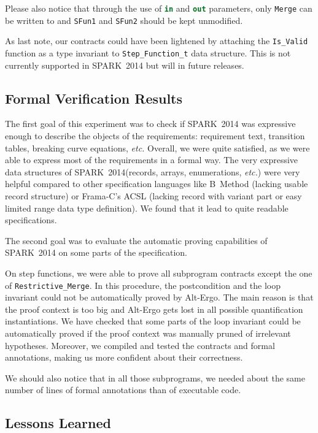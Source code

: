 \documentclass[10pt,a4paper,twocolumn]{article}
\newcommand{\newspark}{SPARK~2014\xspace}
\newcommand{\altergo}{Alt-Ergo\xspace}
\newcommand{\etc}{\textit{etc.}\xspace}
\newcommand{\SPARK}[1]{\lstinline[language=Ada,basicstyle={\footnotesize
      \sffamily},framesep=0pt]$#1$}
\begin{document}
Please also notice that through the use of \SPARK{in} and \SPARK{out}
parameters, only \SPARK{Merge} can be written to and \SPARK{SFun1} and
\SPARK{SFun2} should be kept unmodified.

As last note, our contracts could have been lightened by attaching the
\SPARK{Is_Valid} function as a type invariant to
\SPARK{Step_Function_t} data structure. This is not currently
supported in \newspark but will in future releases.

\subsection{Formal Verification Results}

The first goal of this experiment was to check if \newspark was
expressive enough to describe the objects of the requirements:
requirement text, transition tables, breaking curve equations, \etc
Overall, we were quite satisfied, as we were able to express most of
the requirements in a formal way. The very expressive data structures
of \newspark (records, arrays, enumerations, \etc) were very helpful
compared to other specification languages like B~Method\cite{b-book}
(lacking usable record structure) or Frama-C's ACSL\cite{acsl}
(lacking record with variant part or easy limited range data type
definition). We found that it lead to quite readable specifications.

The second goal was to evaluate the automatic proving capabilities of \newspark
on some parts of the specification.

On step functions, we were able to prove all subprogram
contracts except the one of \SPARK{Restrictive_Merge}. In this procedure, the
postcondition and the loop invariant could not be automatically
proved by \altergo. The main reason is that the proof context is too
big and \altergo gets lost in all possible quantification
instantiations. We have checked that some parts of the loop invariant
could be automatically proved if the proof context was manually pruned
of irrelevant hypotheses. Moreover, we compiled and tested the
contracts and formal annotations, making us more confident about their
correctness.

We should also notice that in all those subprograms, we needed about
the same number of lines of formal annotations than of executable
code.

\subsection{Lessons Learned}
\end{document}
